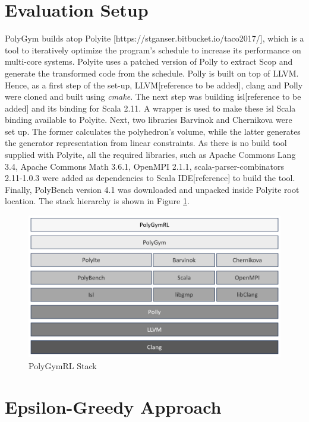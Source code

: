 \documentclass[logo,msc]{infthesis}           %
\begin{document}
\section{Evaluation Setup}

PolyGym builds atop Polyite [https://stganser.bitbucket.io/taco2017/], which is a tool to iteratively optimize the program's schedule to increase its performance on multi-core systems. Polyite uses a patched version of Polly to extract Scop and generate the transformed code from the schedule. Polly is built on top of LLVM. Hence, as a first step of the set-up, LLVM[reference to be added], clang and Polly were cloned and built using \textit{cmake}. The next step was building isl[reference to be added] and its binding for Scala 2.11. A wrapper is used to make these isl Scala binding available to Polyite\cite{10.1145/3109482}. Next, two libraries Barvinok\cite{10.5555/261410.261418} and Chernikova\cite{leverge:inria-00074895} were set up. The former calculates the polyhedron's volume, while the latter generates the generator representation from linear constraints. As there is no build tool supplied with Polyite, all the required libraries, such as Apache Commons Lang 3.4, Apache Commons Math 3.6.1, OpenMPI 2.1.1\cite{OpenMPI}, scala-parser-combinators 2.11-1.0.3 were added as dependencies to Scala IDE[reference] to build the tool. Finally, PolyBench version 4.1 was downloaded and unpacked inside Polyite root location. The stack hierarchy is shown in Figure \ref{fig::stack}.

\begin{figure}[htbp]  
  \centering
  \includegraphics[width=\textwidth]{Images/PolyGymRlStack.png}    
  \caption{PolyGymRL Stack}
  \label{fig::stack}
\end{figure}

\section{Epsilon-Greedy Approach}
\end{document}
